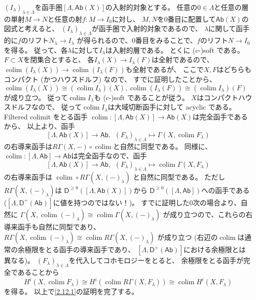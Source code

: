 \documentclass[uplatex,dvipdfmx]{jsarticle}
\makeatletter
\theoremstyle{definition}
\renewenvironment{proof}[1][\proofname]{
  \pushQED{\qed}%
  \normalfont \topsep6\p@\@plus6\p@\relax
  \trivlist
  \item[\hskip\labelsep
    #1\@addpunct{\textbf{.}}]\ignorespaces
}{%
  \popQED\endtrivlist\@endpefalse
}
\providecommand{\proofname}{証明}
\DeclareMathOperator{\colim}{\mathrm{colim}}
\newcommand{\Ab}{\mathsf{Ab}}
\newcommand{\sfD}{\mathsf{D}}
\makeatother
\begin{document}
\begin{proof}
  \((I_{\lambda})_{\lambda\in \Lambda}\)を函手圏\([\Lambda,\Ab(X)]\)の入射的対象とする。
  任意の\(0\in \Lambda\)と任意の層の単射\(M\to N\)と任意の射\(f:M\to I_0\)に対し、
  \(M,N\)を\(0\)番目に配置して\(\Ab(X)\)の図式と考えると、
  \((I_{\lambda})_{\lambda\in \Lambda}\)が函手圏で入射的対象であるので、
  \(\lambda\)に関して函手的に\(f\)のリフト\(N_{\lambda}\to I_{\lambda}\)
  が得られるので、\(0\)番目をみることで、\(f\)のリフト\(N\to I_0\)を得る。
  従って、各\(\lambda\)に対して\(I_{\lambda}\)は入射的層である。
  とくに (\(c\)-)soft である。
  \(F\subset X\)を閉集合とすると、
  各\(I_{\lambda}(X)\to I_{\lambda}(F)\)は全射であるので、
  \(\colim(I_{\lambda}(X))\to \colim(I_{\lambda}(F))\)も全射であるが、
  ここで\(X,F\)はどちらもコンパクト (かつハウスドルフ) なので、
  すでに証明したことから、
  \(\colim(I_{\lambda}(X))\cong (\colim I_{\lambda})(X),
  \colim(I_{\lambda}(F))\cong (\colim I_{\lambda})(F)\)
  が成り立つ。
  従って\(\colim I_{\lambda}\)も (\(c\)-)soft であることが従う。
  \(X\)はコンパクトハウスドルフなので、
  従って\(\colim I_{\lambda}\)は大域切断函手に対して acyclic である。
  Filtered colimit をとる函手
  \(\colim:[\Lambda,\Ab(X)]\to \Ab(X)\)は完全函手であるから、
  以上より、函手
  \[
  [\Lambda,\Ab(X)]\to \Ab, \ \
  (F_{\lambda})_{\lambda\in \Lambda}\mapsto \Gamma(X,\colim F_{\lambda})
  \]
  の右導来函手は\(R\Gamma(X,-)\circ \colim\)と自然に同型である。
  同様に、\(\colim:[\Lambda,\Ab]\to \Ab\)は完全函手なので、函手
  \[
  [\Lambda,\Ab(X)]\to \Ab, \ \
  (F_{\lambda})_{\lambda\in \Lambda}\mapsto \colim \Gamma(X,F_{\lambda})
  \]
  の右導来函手は
  \(\colim \circ R\Gamma(X,(-)_{\lambda})\)
  と自然に同型である。
  ただし
  \(R\Gamma(X,(-)_{\lambda})\)は
  \(\sfD^{\geq 0}([\Lambda,\Ab(X)])\)から
  \(\sfD^{\geq 0}([\Lambda,\Ab])\)への函手である
  (\([\Lambda,\sfD^+(\Ab)]\)に値を持つのではない！)。
  すでに証明した\(0\)次の場合より、自然に
  \(\Gamma(X,\colim (-)_{\lambda}) \cong \colim \Gamma(X,(-)_{\lambda})\)
  が成り立つので、これらの右導来函手も自然に同型であり、
  \(R\Gamma(X,\colim (-)_{\lambda}) \cong \colim R\Gamma(X,(-)_{\lambda})\)
  が成り立つ
  (右辺の\(\colim\)は通常の余極限をとる函手の導来函手であり、
  \([\Lambda,\sfD^+(\Ab)]\)における余極限とは異なる)。
  \((F_{\lambda})_{\lambda\in \Lambda}\)を代入してコホモロジーをとると、
  余極限をとる函手が完全であることから
  \[
  H^i(X,\colim F_{\lambda})\cong
  H^i(\colim R\Gamma(X,F_{\lambda})) \cong
  \colim H^i(X,F_{\lambda})
  \]
  を得る。
  以上で\ref{2.12.1}の証明を完了する。


\end{proof}
\end{document}
